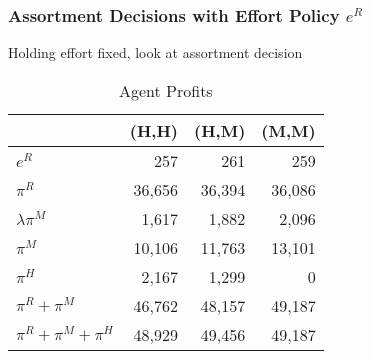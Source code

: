 \documentclass[aspectratio=169]{beamer}
\begin{document}
\begin{frame}
\frametitle{Assortment Decisions with Effort Policy $e^R$}
Holding effort fixed, look at assortment decision
\begin{table}[htp]
\caption{Agent Profits}
\begin{center}
\begin{tabular}{|l| rrr|}
\hline
 & (H,H) & (H,M) & (M,M) \\
 \hline
$e^{R}$ & 257 & 261 & 259 \\ \hline
$\pi^R$ & 36,656 & 36,394 & 36,086 \\
$\lambda \pi^M$ & 1,617 & 1,882  & 2,096\\
$\pi^M$ & 10,106 & 11,763 & 13,101 \\
$\pi^H$ & 2,167 & 1,299 & 0 \\
$\pi^{R} +\pi^{M}$ & 46,762 & 48,157 & 49,187 \\
$\pi^R + \pi^M + \pi^H$ & 48,929 & 49,456 & 49,187 \\ \hline
\end{tabular}
\end{center}
\label{tab:assortmentonly}
\end{table}
\end{frame}
\end{document}
